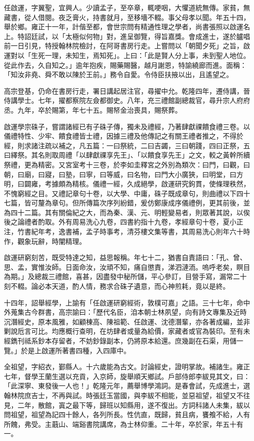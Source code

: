 \begin{pinyinscope}
任啟運，字翼聖，宜興人。少讀孟子，至卒章，輒哽咽，大懼道統無傳。家貧，無藏書，從人借閱。夜乏膏火，持書就月，至移墻不輟。事父母孝以聞。年五十四，舉於鄉。雍正十一年，計偕至都，會世宗問有精通性理之學者，尚書張照以啟運名上。特詔廷試，以「太極似何物」對，進呈御覽，得旨嘉獎。會成進士，遂於臚唱前一日引見，特授翰林院檢討，在阿哥書房行走。上嘗問以「朝聞夕死」之旨，啟運對以「生死一理，未知生，焉知死」。上曰：「此是賢人分上事，未到聖人地位。從此作去，久自知之。」逾年抱疾，賜藥賜醫，越月謝恩，特諭繞廊而進。面稱：「知汝非堯、舜不敢以陳於王前。」務令自愛。令侍臣扶掖以出，且遙望之。

高宗登基，仍命在書房行走，署日講起居注官，尋擢中允。乾隆四年，遷侍講，晉侍講學士。七年，擢都察院左僉都御史。八年，充三禮館副總裁官，尋升宗人府府丞。九年，卒於賜第，年七十五。賜帑金治喪具，賜祭葬。

啟運學宗硃子，嘗謂諸經已有子硃子傳，獨未及禮經，乃著肆獻祼饋食禮三卷。以儀禮特性、少牢、饋食禮皆士禮，因據三禮及他傳記之有關王禮者推之，不得於經，則求諸注疏以補之，凡五篇：一曰祭統，二曰吉蠲，三曰朝踐，四曰正祭，五曰繹祭。其名則取周禮「以肆獻祼享先王」、「以饋食享先王」之文，較之黃幹所續祭禮，更為精密。又宮室考十三卷，於李如圭釋宮之外別為類次：曰門，曰觀，曰朝，曰廟，曰寢，曰塾，曰寧，曰等威，曰名物，曰門大小廣狹，曰明堂，曰方明，曰闢雍，考據頗為精核。儀禮一經，久成絕學，啟運研究鉤貫，使條理秩然，不愧窮經之目。又禮記章句十卷，以大學、中庸，硃子既成章句，則曲禮以下四十七篇，皆可釐為章句。但所傳篇次序列紛錯，爰仿鄭康成序儀禮例，更其前後，並為四十二篇。其有關倫紀之大，而為秦、漢、元、明輕變易者，則眾著其說，以俟後之論禮者酌取。外有周易洗心九卷，四書約指十九卷，孝經章句十卷，夏小正注，竹書紀年考，逸書補，孟子時事考，清芬樓文集等書，其周易洗心則年六十時作，觀象玩辭，時闡精理。

啟運研窮刻苦，既受特達之知，益思報稱。年七十二，猶書自責語曰：「孔、曾、思、孟，實惟汝師。日面命汝，汝頑不知，痛自懲責，涕泗漣洏。嗚呼老矣，瞑目為期。」及總裁三禮館，喜甚，因盡發中秘所儲，平心參訂，目營手寫，漏常二十刻不輟。論必本天道，酌人情，務求合硃子遺意，而心神煎耗，竟以是終。

十四年，詔舉經學，上諭有「任啟運研窮經術，敦樸可嘉」之語。三十七年，命中外蒐集古今群書，高宗諭曰：「歷代名臣，洎本朝士林夙望，向有詩文專集及近時沉潛經史，原本風雅，如顧棟高、陳祖範、任啟運、沈德潛輩，亦各著成編，並非剿說卮言可比。均應概行查明，在坊肆者或量為給價，家藏者或官為裝印。至有未經鐫刊祗系鈔本存留者，不妨鈔錄副本，仍將原本給還。庶幾副在石渠，用儲一覽。」於是上啟運所著書四種，入四庫中。

全祖望，字紹衣，鄞縣人。十六歲能為古文。討論經史，證明掌故。補諸生。雍正七年，督學王蘭生選以充貢，入京師，旋舉順天鄉試。戶部侍郎李紱見其文，曰：「此深寧、東發後一人也！」乾隆元年，薦舉博學鴻詞。是春會試，先成進士，選翰林院庶吉士，不再與試。時張廷玉當國，與李紱不相能，並惡祖望，祖望又不往見，二年，散館，寘之最下等，歸班以知縣用，遂不復出。方詞科諸人未集，紱以問祖望，祖望為記四十餘人，各列所長。性伉直，既歸，貧且病，饔飧不給，人有所餽，弗受。主蕺山、端谿書院講席，為士林仰重。二十年，卒於家，年五十有一。


\end{pinyinscope}
